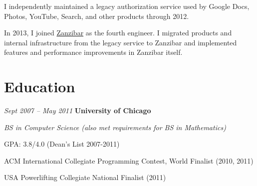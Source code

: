 \documentclass[10pt, letterpaper]{article}
\begin{document}
\vspace{0.10 cm}
\begin{onecolentry}
    \begin{highlights}
        \item I independently maintained a legacy authorization service used by Google Docs, Photos, YouTube, Search, and other products through 2012.
        \item In 2013, I joined \href{https://research.google/pubs/zanzibar-googles-consistent-global-authorization-system/}{Zanzibar} as the fourth engineer. I migrated products and internal infrastructure from the legacy service to Zanzibar and implemented features and performance improvements in Zanzibar itself.
    \end{highlights}
\end{onecolentry}

\section{Education}

\begin{twocolentry}{
    \textit{Sept 2007 – May 2011}
}
    \textbf{University of Chicago}
\end{twocolentry}

\begin{onecolentry}
    \textit{BS in Computer Science (also met requirements for BS in Mathematics)}
\end{onecolentry}

\vspace{0.10 cm}
\begin{onecolentry}
    \begin{highlights}
        \item GPA: 3.8/4.0 (Dean's List 2007-2011)
        \item ACM International Collegiate Programming Contest, World Finalist (2010, 2011)
        \item USA Powerlifting Collegiate National Finalist (2011)
    \end{highlights}
\end{onecolentry}
\end{document}
